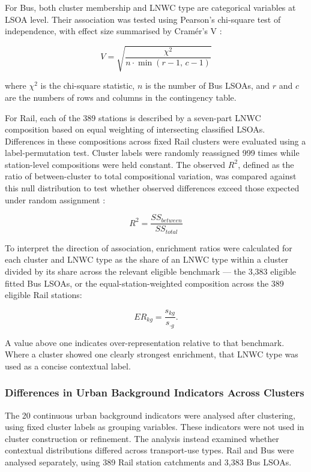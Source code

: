 For Bus, both cluster membership and LNWC type are categorical variables at LSOA level. Their association was tested using Pearson's chi-square test of independence, with effect size summarised by Cramér's V \citep{Cramer1999}:

\begin{equation}
V = \sqrt{\frac{\chi^2}{n \cdot \min(r-1,\, c-1)}}
\end{equation}

where $\chi^2$ is the chi-square statistic, $n$ is the number of Bus LSOAs, and $r$ and $c$ are the numbers of rows and columns in the contingency table.

For Rail, each of the 389 stations is described by a seven-part LNWC composition based on equal weighting of intersecting classified LSOAs. Differences in these compositions across fixed Rail clusters were evaluated using a label-permutation test. Cluster labels were randomly reassigned 999 times while station-level compositions were held constant. The observed $R^2$, defined as the ratio of between-cluster to total compositional variation, was compared against this null distribution to test whether observed differences exceed those expected under random assignment \citep{Anderson2001}:

\begin{equation}
R^2 = \frac{SS_{between}}{SS_{total}}
\end{equation}

To interpret the direction of association, enrichment ratios were calculated for each cluster and LNWC type as the share of an LNWC type within a cluster divided by its share across the relevant eligible benchmark --- the 3,383 eligible fitted Bus LSOAs, or the equal-station-weighted composition across the 389 eligible Rail stations:

\begin{equation}
ER_{kg} = \frac{s_{kg}}{s_{\cdot g}}.
\end{equation}

A value above one indicates over-representation relative to that benchmark. Where a cluster showed one clearly strongest enrichment, that LNWC type was used as a concise contextual label.

\subsubsection{Differences in Urban Background Indicators Across Clusters}

The 20 continuous urban background indicators were analysed after clustering, using fixed cluster labels as grouping variables. These indicators were not used in cluster construction or refinement. The analysis instead examined whether contextual distributions differed across transport-use types. Rail and Bus were analysed separately, using 389 Rail station catchments and 3,383 Bus LSOAs.

